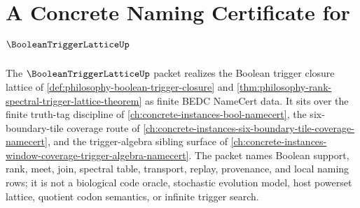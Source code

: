 \chapter{A Concrete Naming Certificate for $\BooleanTriggerLatticeUp$}
\label{ch:concrete-instances-boolean-trigger-lattice-namecert}

The $\BooleanTriggerLatticeUp$ packet realizes the Boolean trigger closure lattice of \autoref{def:philosophy-boolean-trigger-closure} and \autoref{thm:philosophy-rank-spectral-trigger-lattice-theorem} as finite BEDC NameCert data. It sits over the finite truth-tag discipline of \autoref{ch:concrete-instances-bool-namecert}, the six-boundary-tile coverage route of \autoref{ch:concrete-instances-six-boundary-tile-coverage-namecert}, and the trigger-algebra sibling surface of \autoref{ch:concrete-instances-window-coverage-trigger-algebra-namecert}. The packet names Boolean support, rank, meet, join, spectral table, transport, replay, provenance, and local naming rows; it is not a biological code oracle, stochastic evolution model, host powerset lattice, quotient codon semantics, or infinite trigger search.

